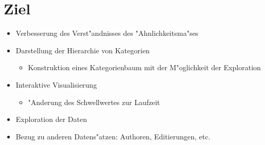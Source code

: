 \section{Ziel}
\begin{itemize}
    \item Verbesserung des Verst"andnisses des "Ahnlichkeitsma"ses
    \item Darstellung der Hierarchie von Kategorien
    \begin{itemize}
      \item Konstruktion eines Kategorienbaum mit der M"oglichkeit der Exploration
    \end{itemize}
    \item Interaktive Visualisierung
    \begin{itemize}
      \item "Anderung des Schwellwertes zur Laufzeit
    \end{itemize}
    \item Exploration der Daten
    \item Bezug zu anderen Datens"atzen: Authoren, Editierungen, etc.
\end{itemize}

















